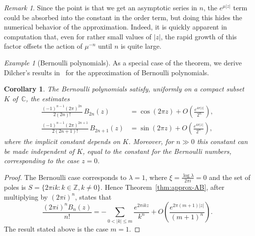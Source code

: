\documentclass[11pt,a4paper]{amsart}
\newcommand{\Z}{\mathbb{Z}}
\newcommand{\C}{\mathbb{C}}
\theoremstyle{plain}
\newtheorem{corollary}[theorem]{Corollary}
\theoremstyle{remark}
\newtheorem{remark}{Remark}
\newtheorem{example}{Example}
\begin{document}
\begin{remark}
Since the point is that we get an asymptotic series in $n$, the $e^{\mu|z|}$ term could be absorbed into the constant in the order term, but doing this hides the numerical behavior of the approximation. Indeed, it is quickly apparent in computation that, even for rather small values of $|z|$, the rapid growth of this factor offsets the action of $\mu^{-n}$ until $n$ is quite large.
\end{remark}


\begin{example}[Bernoulli polynomials] As a special case of the theorem, we derive Dilcher's results in~\cite{Dil} for the approximation of Bernoulli polynomials.
\end{example}

\begin{corollary}
\label{cor:approx-B}
The Bernoulli polynomials satisfy, uniformly on a compact subset $K$ of~$\C$, the estimates
%
\begin{equation}
\label{eq:approx-B}
\begin{aligned}
     \frac{(-1)^{n-1} (2\pi)^{2n}}{2 (2n)!} \,B_{2n}(z)
  &= \cos(2\pi z) + O\left(\frac{e^{4\pi|z|}}{2^{n}}\right),
  \\[2pt]
     \frac{(-1)^{n-1} (2\pi)^{2n+1}}{2 (2n+1)!} \,B_{2n+1}(z)
  &= \sin(2\pi z) + O\left(\frac{e^{4\pi|z|}}{2^{n}}\right),
\end{aligned}
\end{equation}
%
where the implicit constant depends on $K$. Moreover, for $n \gg 0$ this constant can be made
independent of $K$, equal to the constant for the Bernoulli numbers, corresponding
to the case $z = 0$.
\end{corollary}

\begin{proof}
The Bernoulli case corresponds to $\lambda = 1$, where $\xi = \frac{\log\lambda}{2\pi i} = 0$ and the set of poles is $S = \{ 2 \pi i k : k \in \Z, k \neq 0 \}$. Hence Theorem~\ref{thm:approx-AB}, after multiplying by $(2\pi i)^{n}$, states that
\begin{equation}
\label{eq:approx-Ber}
	  \frac{(2\pi i)^{n} B_{n}(z)}{n!}
	= - \sum_{0 < |k| \leq m} \frac{e^{2\pi i k z}}{k^{n}}
	  + O\left(\frac{e^{2\pi(m+1)|z|}}{(m+1)^{n}}\right).
\end{equation}
The result stated above is the case $m=1$.
\end{proof}




\end{document}
